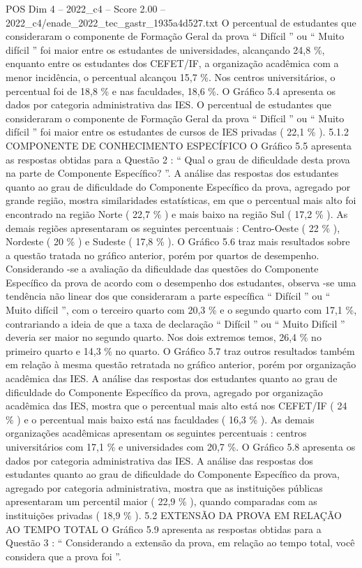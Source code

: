 \begin{textsample}{POS Dim 4 – 2022\_c4 – Score 2.00 – 2022\_c4/enade\_2022\_tec\_gastr\_1935a4d527.txt}
O percentual de estudantes que consideraram o componente de Formação Geral da prova “ Difícil ” ou “ Muito difícil ” foi maior entre os estudantes de universidades, alcançando 24,8 \%, enquanto entre os estudantes dos CEFET/IF, a organização acadêmica com a menor incidência, o percentual alcançou 15,7 \%.
Nos centros universitários, o percentual foi de 18,8 \% e nas faculdades, 18,6 \%.
O Gráfico 5.4 apresenta os dados por categoria administrativa das IES.
O percentual de estudantes que consideraram o componente de Formação Geral da prova “ Difícil ” ou “ Muito difícil ” foi maior entre os estudantes de cursos de IES privadas ( 22,1 \% ). 5.1.2 COMPONENTE DE CONHECIMENTO ESPECÍFICO O Gráfico 5.5 apresenta as respostas obtidas para a Questão 2 : “ Qual o grau de dificuldade desta prova na parte de Componente Específico? ”.
A análise das respostas dos estudantes quanto ao grau de dificuldade do Componente Específico da prova, agregado por grande região, mostra similaridades estatísticas, em que o percentual mais alto foi encontrado na região Norte ( 22,7 \% ) e mais baixo na região Sul ( 17,2 \% ).
As demais regiões apresentaram os seguintes percentuais : Centro-Oeste ( 22 \% ), Nordeste ( 20 \% ) e Sudeste ( 17,8 \% ).
O Gráfico 5.6 traz mais resultados sobre a questão tratada no gráfico anterior, porém por quartos de desempenho.
Considerando -se a avaliação da dificuldade das questões do Componente Específico da prova de acordo com o desempenho dos estudantes, observa -se uma tendência não linear dos que consideraram a parte específica “ Difícil ” ou “ Muito difícil ”, com o terceiro quarto com 20,3 \% e o segundo quarto com 17,1 \%, contrariando a ideia de que a taxa de declaração “ Difícil ” ou “ Muito Difícil ” deveria ser maior no segundo quarto.
Nos dois extremos temos, 26,4 \% no primeiro quarto e 14,3 \% no quarto.
O Gráfico 5.7 traz outros resultados também em relação à mesma questão retratada no gráfico anterior, porém por organização acadêmica das IES.
A análise das respostas dos estudantes quanto ao grau de dificuldade do Componente Específico da prova, agregado por organização acadêmica das IES, mostra que o percentual mais alto está nos CEFET/IF ( 24 \% ) e o percentual mais baixo está nas faculdades ( 16,3 \% ).
As demais organizações acadêmicas apresentam os seguintes percentuais : centros universitários com 17,1 \% e universidades com 20,7 \%.
O Gráfico 5.8 apresenta os dados por categoria administrativa das IES.
A análise das respostas dos estudantes quanto ao grau de dificuldade do Componente Específico da prova, agregado por categoria administrativa, mostra que as instituições públicas apresentaram um percentil maior ( 22,9 \% ), quando comparadas com as instituições privadas ( 18,9 \% ). 5.2 EXTENSÃO DA PROVA EM RELAÇÃO AO TEMPO TOTAL O Gráfico 5.9 apresenta as respostas obtidas para a Questão 3 : “ Considerando a extensão da prova, em relação ao tempo total, você considera que a prova foi ”.

\end{textsample}
